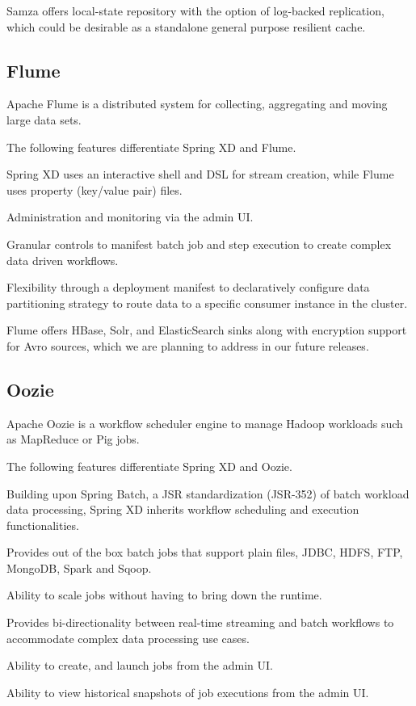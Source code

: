 Samza offers local-state repository with the option of log-backed replication,
which could be desirable as a standalone general purpose resilient cache.

\subsection{Flume}
Apache Flume\cite{flume} is a distributed system for collecting, aggregating and
moving large data sets.

The following features differentiate Spring XD and Flume.

\begin{itemize*}
\item Spring XD uses an interactive shell and DSL for stream creation,
while Flume uses property (key/value pair) files.
\item Administration and monitoring via the admin UI.
\item Granular controls to manifest batch job and step execution to create
complex data driven workflows.
\item Flexibility through a deployment manifest to declaratively configure data
partitioning strategy to route data to a specific consumer instance in the cluster.
\end{itemize*}

Flume offers HBase, Solr, and ElasticSearch sinks along with encryption support
for Avro sources, which we are planning to address in our future releases.

\subsection{Oozie}
Apache Oozie\cite{oozie} is a workflow scheduler engine to manage Hadoop \cite{hadoop}
workloads such as MapReduce or Pig jobs.

The following features differentiate Spring XD and Oozie.

\begin{itemize*}
\item Building upon Spring Batch, a JSR standardization (JSR-352) of batch
workload data processing, Spring XD inherits workflow scheduling and execution
functionalities.
\item Provides out of the box batch jobs that support plain files, JDBC, HDFS,
FTP, MongoDB, Spark and Sqoop.
\item Ability to scale jobs without having to bring down the runtime.
\item Provides bi-directionality between real-time streaming and batch
workflows to accommodate complex data processing use cases.
\item Ability to create, and launch jobs from the admin UI.
\item Ability to view historical snapshots of job executions from the admin UI.
\end{itemize*}

